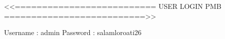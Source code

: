 <<========================== USER LOGIN PMB ==========================>>

Username : admin
Password : salamloroati26